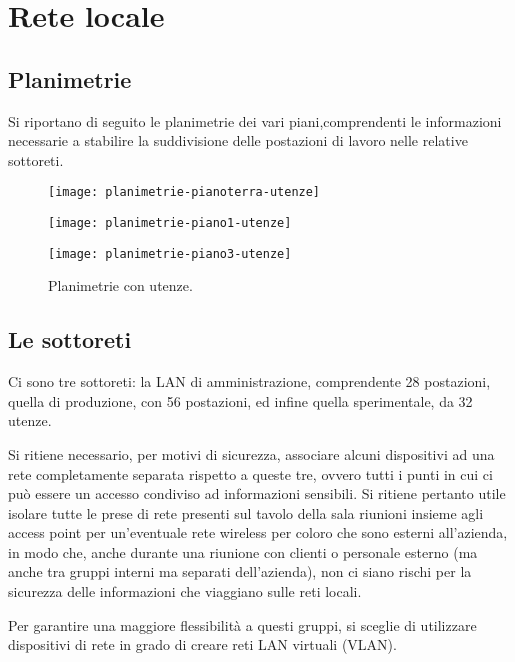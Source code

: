 
\chapter{Rete locale}

\section{Planimetrie}
Si riportano di seguito le planimetrie dei vari piani,comprendenti le informazioni necessarie
a stabilire la suddivisione delle postazioni di lavoro nelle relative sottoreti.

\begin{figure}[ht]
  \centering
  \begin{minipage}{.5\textwidth}
    \texttt{[image: planimetrie-pianoterra-utenze]}
  \end{minipage}%
  \begin{minipage}{.5\textwidth}
    \texttt{[image: planimetrie-piano1-utenze]}
  \end{minipage}
  \begin{minipage}{.5\textwidth}
    \texttt{[image: planimetrie-piano3-utenze]}
  \end{minipage}
  \caption{Planimetrie con utenze.}\label{fig:planimetrie-utenze}
\end{figure}

\newpage
\section{Le sottoreti}
Ci sono tre sottoreti: la LAN di amministrazione, comprendente 28 postazioni, quella di produzione,
con 56 postazioni, ed infine quella sperimentale, da 32 utenze.

Si ritiene necessario, per motivi di sicurezza, associare alcuni dispositivi ad una rete completamente separata
rispetto a queste tre, ovvero tutti i punti in cui ci può essere un accesso condiviso ad informazioni sensibili.
Si ritiene pertanto utile isolare tutte le prese di rete presenti sul tavolo della sala riunioni insieme agli access point
per un'eventuale rete wireless per coloro che sono esterni all'azienda, in modo che, anche durante una riunione con
clienti o personale esterno (ma anche tra gruppi interni ma separati dell'azienda), non ci siano rischi per la sicurezza
delle informazioni che viaggiano sulle reti locali.

Per garantire una maggiore flessibilità a questi gruppi, si sceglie di utilizzare dispositivi di rete in grado
di creare reti LAN virtuali (VLAN).